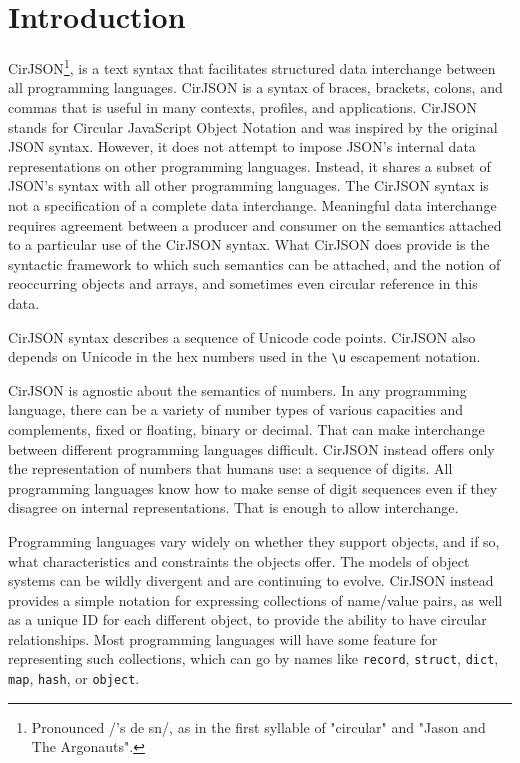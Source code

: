 
\chapter*{Introduction}

CirJSON\footnote{Pronounced {\doulos/'s{\textrevepsilon\textrhoticity} d{\textyogh}e{\textsci} s{\textschwa}n/}, as in the first syllable of "circular" and "Jason and The Argonauts".}, is a text syntax that facilitates structured data interchange between all programming languages.
CirJSON is a syntax of braces, brackets, colons, and commas that is useful in many contexts, profiles, and applications.
CirJSON stands for Circular JavaScript Object Notation and was inspired by the original JSON syntax.
However, it does not attempt to impose JSON's internal data representations on other programming languages.
Instead, it shares a subset of JSON's syntax with all other programming languages.
The CirJSON syntax is not a specification of a complete data interchange.
Meaningful data interchange requires agreement between a producer and consumer on the semantics attached to a particular use of the CirJSON syntax.
What CirJSON does provide is the syntactic framework to which such semantics can be attached, and the notion of reoccurring objects and arrays, and sometimes even circular reference in this data.

CirJSON syntax describes a sequence of Unicode code points.
CirJSON also depends on Unicode in the hex numbers used in the \texttt{{\textbackslash}u} escapement notation.

CirJSON is agnostic about the semantics of numbers.
In any programming language, there can be a variety of number types of various capacities and complements, fixed or floating, binary or decimal.
That can make interchange between different programming languages difficult.
CirJSON instead offers only the representation of numbers that humans use: a sequence of digits.
All programming languages know how to make sense of digit sequences even if they disagree on internal representations.
That is enough to allow interchange.

Programming languages vary widely on whether they support objects, and if so, what characteristics and constraints the objects offer.
The models of object systems can be wildly divergent and are continuing to evolve.
CirJSON instead provides a simple notation for expressing collections of name/value pairs, as well as a unique ID for each different object, to provide the ability to have circular relationships.
Most programming languages will have some feature for representing such collections, which can go by names like \texttt{record}, \texttt{struct}, \texttt{dict}, \texttt{map}, \texttt{hash}, or \texttt{object}.

